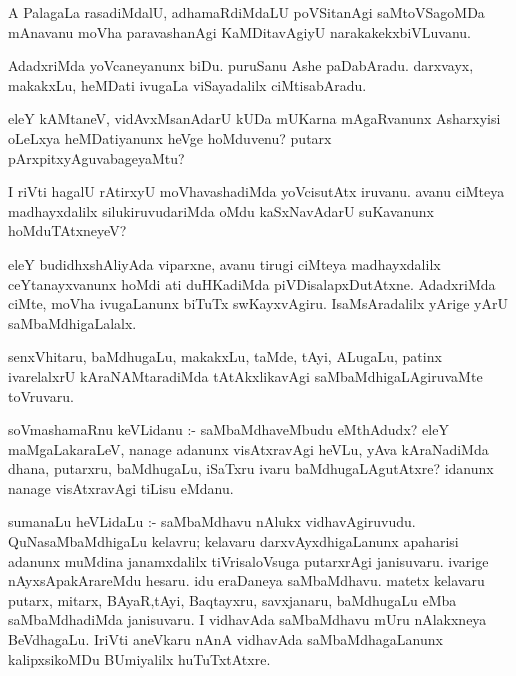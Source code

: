 \documentclass{article}
\begin{document}
\begin{mn}
A PalagaLa rasadiMdalU, adhamaRdiMdaLU poVSitanAgi saMtoVSagoMDa mAnavanu
 moVha paravashanAgi KaMDitavAgiyU narakakekxbiVLuvanu.
\end{mn}

\begin{mn}
AdadxriMda yoVcaneyanunx biDu. puruSanu Ashe paDabAradu. darxvayx, makakxLu, 
heMDati ivugaLa viSayadalilx ciMtisabAradu. 
\end{mn}

\begin{mn}
eleY kAMtaneV, vidAvxMsanAdarU kUDa mUKarna mAgaRvanunx Asharxyisi oLeLxya 
heMDatiyanunx heVge hoMduvenu? putarx pArxpitxyAguvabageyaMtu?
\end{mn}

\begin{mn}
I riVti hagalU rAtirxyU moVhavashadiMda yoVcisutAtx iruvanu.  avanu ciMteya 
madhayxdalilx silukiruvudariMda oMdu kaSxNavAdarU suKavanunx hoMduTAtxneyeV? 
\end{mn}

\begin{mn}
eleY budidhxshAliyAda viparxne, avanu tirugi ciMteya madhayxdalilx ceYtanayxvanunx 
hoMdi ati duHKadiMda piVDisalapxDutAtxne. AdadxriMda ciMte, moVha ivugaLanunx 
biTuTx swKayxvAgiru.  IsaMsAradalilx yArige yArU saMbaMdhigaLalalx.
\end{mn}

\begin{mn}
senxVhitaru, baMdhugaLu, makakxLu, taMde, tAyi, ALugaLu, patinx ivarelalxrU 
kAraNAMtaradiMda tAtAkxlikavAgi saMbaMdhigaLAgiruvaMte toVruvaru. 
\end{mn}

\begin{mn}
soVmashamaRnu keVLidanu :- saMbaMdhaveMbudu eMthAdudx?  eleY maMgaLakaraLeV,
 nanage adanunx visAtxravAgi heVLu, yAva kAraNadiMda dhana, putarxru, baMdhugaLu,
 iSaTxru ivaru baMdhugaLAgutAtxre? idanunx nanage visAtxravAgi tiLisu eMdanu.
\end{mn}

\begin{mn}
sumanaLu heVLidaLu :- saMbaMdhavu nAlukx vidhavAgiruvudu.  QuNasaMbaMdhigaLu 
kelavru; kelavaru darxvAyxdhigaLanunx  apaharisi adanunx muMdina janamxdalilx 
tiVrisaloVsuga putarxrAgi janisuvaru. ivarige nAyxsApakArareMdu hesaru.  idu 
eraDaneya saMbaMdhavu. matetx kelavaru putarx, mitarx, BAyaR,tAyi, Baqtayxru, 
savxjanaru, baMdhugaLu eMba saMbaMdhadiMda janisuvaru. I vidhavAda saMbaMdhavu 
mUru nAlakxneya BeVdhagaLu. IriVti aneVkaru nAnA vidhavAda  saMbaMdhagaLanunx 
kalipxsikoMDu BUmiyalilx huTuTxtAtxre.
\end{mn}
\end{document}
